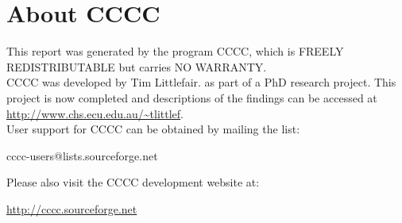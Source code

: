 \section{About CCCC}

This report was generated by the program CCCC, which is FREELY REDISTRIBUTABLE but carries NO WARRANTY. \\

CCCC was developed by Tim Littlefair. as part of a PhD research project. This project is now completed and descriptions of the findings can
be accessed at \url{http://www.chs.ecu.edu.au/~tlittlef}. \\

User support for CCCC can be obtained by mailing the list:
\begin{center}cccc-users@lists.sourceforge.net\end{center}

Please also visit the CCCC development website at:
\begin{center}\url{http://cccc.sourceforge.net}\end{center}